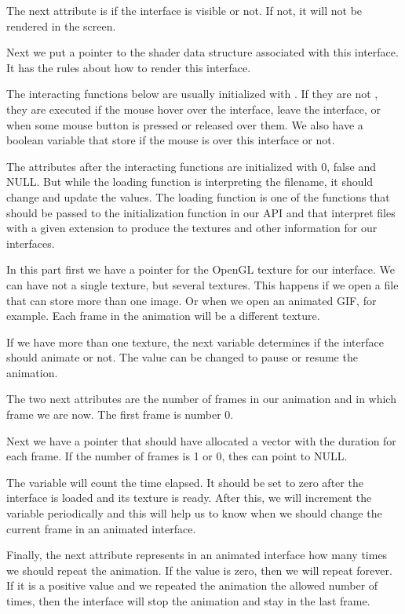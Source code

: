 The next attribute is if the interface is visible or not. If not, it
will not be rendered in the screen.

Next we put a pointer to the shader data structure associated with
this interface. It has the rules about how to render this interface.

The interacting functions below are usually initialized
with . If they are not , they are
executed if the mouse hover over the interface, leave the interface,
or when some mouse button is pressed or released over them. We also
have a boolean variable that store if the mouse is over this interface
or not.

The attributes after the interacting functions are initialized with 0,
false and NULL. But while the loading function is interpreting the
filename, it should change and update the values. The loading function
is one of the functions that should be passed to the initialization
function in our API and that interpret files with a given extension to
produce the textures and other information for our interfaces.

In this part first we have a pointer for the OpenGL texture for our
interface. We can have not a single texture, but several
textures. This happens if we open a file that can store more than one
image. Or when we open an animated GIF, for example. Each frame in the
animation will be a different texture.

If we have more than one texture, the next variable determines if the
interface should animate or not. The value can be changed to pause or
resume the animation.

The two next attributes are the number of frames in our animation and
in which frame we are now. The first frame is number 0.

Next we have a pointer that should have allocated a vector with the
duration for each frame. If the number of frames is 1 or 0, thes can
point to NULL.

The variable  will count the time elapsed. It should be
set to zero after the interface is loaded and its texture is
ready. After this, we will increment the variable periodically and
this will help us to know when we should change the current frame in
an animated interface.

Finally, the next attribute represents in an animated interface how
many times we should repeat the animation. If the value is zero, then
we will repeat forever. If it is a positive value and we repeated the
animation the allowed number of times, then the interface will stop
the animation and stay in the last frame.

